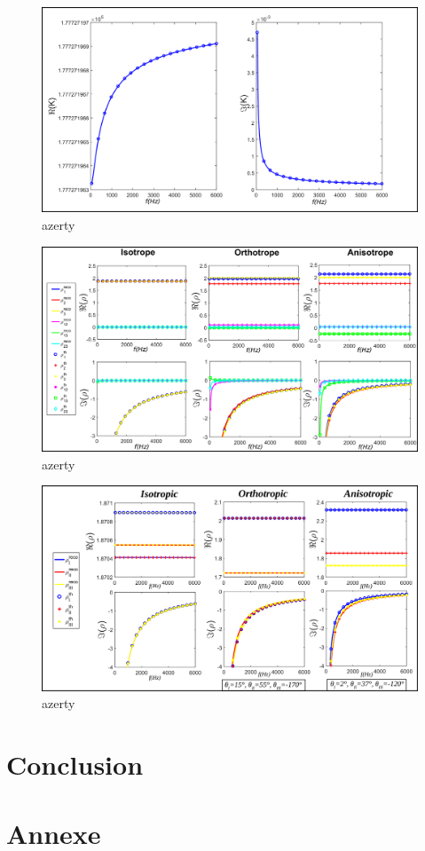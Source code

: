 \documentclass{article}
\begin{document}
    \begin{figure}[ht]
        \centering
        \includegraphics[scale=0.3]{Bulk.png}
        \caption{azerty}
        \label{Grph_K}
    \end{figure}

    \begin{figure}[ht]
        \centering
        \includegraphics[scale=0.3]{Density_rot.png}
        \caption{azerty}
        \label{Grph_rho_rot}
    \end{figure}


    \begin{figure}[ht]
        \centering
        \includegraphics[scale=0.3]{Density_dir.png}
        \caption{azerty}
        \label{Grph_rho_dir}
    \end{figure}
\section{Conclusion}


\section{Annexe}
\end{document}
